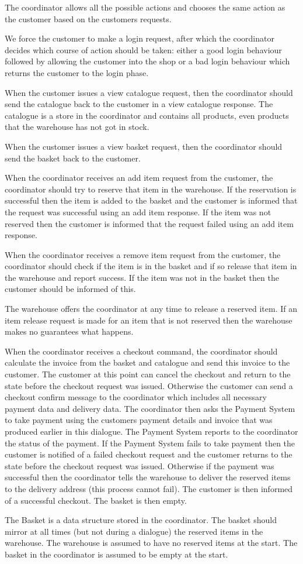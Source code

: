 \documentclass[12pt]{article}
\begin{document}
The coordinator allows all the possible actions and chooses the same
action as the customer based on the customers requests.

We force the customer to make a login request, after which the
coordinator decides which course of action should be taken: either a
good login behaviour followed by allowing the customer into the shop
or a bad login behaviour which returns the customer to the login
phase.

When the customer issues a view catalogue request, then the coordinator
should send the catalogue back to the customer in a view catalogue
response. The catalogue is a store in the coordinator and contains all
products, even products that the warehouse has not got in stock.

When the customer issues a view basket request, then the coordinator
should send the basket back to the customer.

When the coordinator receives an add item request from the customer,
the coordinator should try to reserve that item in the warehouse. If
the reservation is successful then the item is added to the basket and
the customer is informed that the request was successful using an add
item response. If the item was not reserved then the customer is
informed that the request failed using an add item response.

When the coordinator receives a remove item request from the customer,
the coordinator should check if the item is in the basket and if so
release that item in the warehouse and report success. If the item was
not in the basket then the customer should be informed of this.

The warehouse offers the coordinator at any time to release a reserved
item. If an item release request is made for an item that is not
reserved then the warehouse makes no guarantees what happens.

When the coordinator receives a checkout command, the coordinator
should calculate the invoice from the basket and catalogue and send
this invoice to the customer. The customer at this point can cancel
the checkout and return to the state before the checkout request was
issued. Otherwise the customer can send a checkout confirm message to
the coordinator which includes all necessary payment data and delivery
data. The coordinator then asks the Payment System to take payment
using the customers payment details and invoice that was produced
earlier in this dialogue. The Payment System reports to the
coordinator the status of the payment. If the Payment System fails to
take payment then the customer is notified of a failed checkout
request and the customer returns to the state before the checkout
request was issued. Otherwise if the payment was successful then the
coordinator tells the warehouse to deliver the reserved items to the
delivery address (this process cannot fail). The customer is then
informed of a successful checkout. The basket is then empty.

The Basket is a data structure stored in the coordinator. The basket
should mirror at all times (but not during a dialogue) the reserved
items in the warehouse. The warehouse is assumed to have no reserved
items at the start. The basket in the coordinator is assumed to be
empty at the start.
\end{document}
